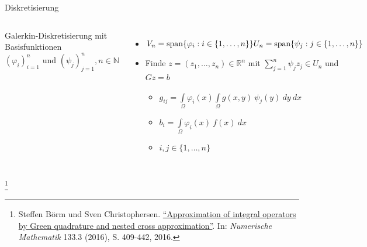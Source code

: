\documentclass[10pt]{beamer}
\let\svthefootnote\thefootnote
\begin{document}
\begin{frame}{Diskretisierung}
  \begin{columns}
      Galerkin-Diskretisierung mit Basisfunktionen\\
      \({(\varphi_{i})}_{i = 1}^{n} \text{ und }
        {(\psi_{j})}_{j = 1}^{n}, n \in \mathbb{N}\)
      \begin{itemize}
        \item \( V_{n} = \text{span}\{ \varphi_{i} : i \in \{ 1, \hdots, n\} \}
                \newline
                U_{n} = \text{span}\{ \psi_{j} : j \in \{ 1, \hdots, n\} \} \)
        \item Finde \(z = (z_{1}, \hdots, z_{n}) \in \mathbb{R}^{n} \) mit
              \( \sum\limits_{j = 1}^{n} \psi_{j} z_{j} \in U_{n} \) 
              und \( Gz = b \)
        \begin{itemize}
          \item \( g_{ij} = \int\limits_{\Omega} \varphi_{i}(x)
                   \int\limits_{\Omega} g(x, y) \ \psi_{j}(y) \ dy \ dx \)
          \item \(b_{i} = \int\limits_{\Omega} \varphi_{i}(x) \ f(x) \ dx\)
          \item \( i, j \in \{ 1, \hdots, n \} \)
        \end{itemize}
      \end{itemize}
      \centering
      \includegraphics[width=1.5\linewidth]{figures/fg-sphere-tri.pdf}
  \end{columns}
  \footnotesize
  \let\thefootnote\relax\footnote{Steffen Börm und Sven Christophersen.
  \href{https://link.springer.com/article/10.1007\%2Fs00211-015-0757-y}{
  ``Approximation of integral operators by Green quadrature and nested cross 
  approximation''}. In: \textit{Numerische Mathematik} 133.3 (2016), S. 
  409-442, 2016.}
  \addtocounter{footnote}{-1}\let\thefootnote\svthefootnote\relax
  \normalsize
\end{frame}
\end{document}
